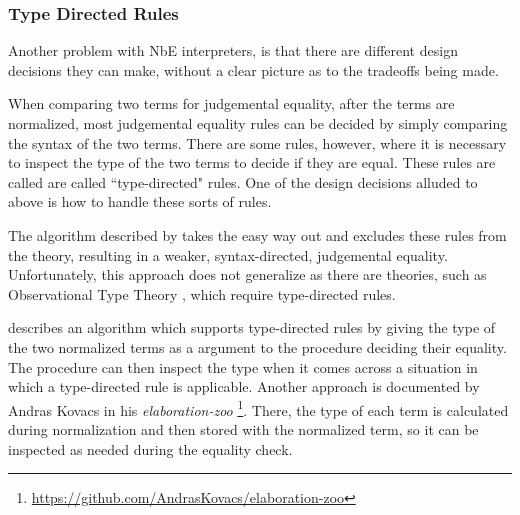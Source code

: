 \documentclass{article}
\begin{document}

\subsubsection{Type Directed Rules}

Another problem with NbE interpreters, is that there are different design decisions they can make, without a clear picture as to the tradeoffs being made.

When comparing two terms for judgemental equality, after the terms are normalized, most judgemental equality rules can be decided by simply comparing the syntax of the two terms.
There are some rules, however, where it is necessary to inspect the type of the two terms to decide if they are equal.
These rules are called are called ``type-directed" rules.
One of the design decisions alluded to above is how to handle these sorts of rules.

The algorithm described by \citet{Coquand1996} takes the easy way out and excludes these rules from the theory, resulting in a weaker, syntax-directed, judgemental equality.
Unfortunately, this approach does not generalize as there are theories, such as Observational Type Theory \citep{Altenkirch2007}, which require type-directed rules.

\citet{Chapman2005} describes an algorithm which supports type-directed rules by giving the type of the two normalized terms as a argument to the procedure deciding their equality.
The procedure can then inspect the type when it comes across a situation in which a type-directed rule is applicable.
Another approach is documented by Andras Kovacs in his \textit{elaboration-zoo} \footnote{\url{https://github.com/AndrasKovacs/elaboration-zoo}}.
There, the type of each term is calculated during normalization and then stored with the normalized term, so it can be inspected as needed during the equality check.
\end{document}
